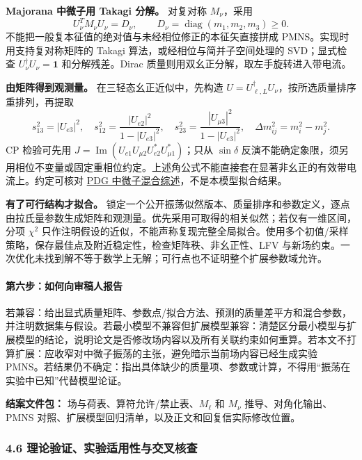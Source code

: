 \documentclass[
  chinese,
  UTF8]{ctexart}
\begin{document}
\textbf{Majorana 中微子用 Takagi 分解。} 对复对称 \(M_\nu\)，采用 \[
U_\nu^T M_\nu U_\nu=D_\nu,\qquad D_\nu=\operatorname{diag}(m_1,m_2,m_3)\ge0.
\] 不能把一般复本征值的绝对值与未经相位修正的本征矢直接拼成
PMNS。实现时用支持复对称矩阵的 Takagi 算法，或经相位与简并子空间处理的
SVD；显式检查 \(U_\nu^\dagger U_\nu=\mathbf1\) 和分解残差。Dirac
质量则用双幺正分解，取左手旋转进入带电流。

\textbf{由矩阵得到观测量。} 在三轻态幺正近似中，先构造
\(U=U_{\ell,L}^\dagger U_\nu\)，按所选质量排序重排列，再提取 \[
s_{13}^2=|U_{e3}|^2,\quad
s_{12}^2=\frac{|U_{e2}|^2}{1-|U_{e3}|^2},\quad
s_{23}^2=\frac{|U_{\mu3}|^2}{1-|U_{e3}|^2},
\quad\Delta m_{ij}^2=m_i^2-m_j^2.
\] CP 检验可先用
\(J=\operatorname{Im}(U_{e1}U_{\mu2}U_{e2}^*U_{\mu1}^*)\)；只从
\(\sin\delta\)
反演不能确定象限，须另用相位不变量或固定重相位约定。上述角公式不能直接套在显著非幺正的有效带电流上。约定可核对
\href{https://pdg.lbl.gov/2025/reviews/rpp2025-rev-neutrino-mixing.pdf}{PDG
中微子混合综述}，不是本模型拟合结果。

\textbf{有了可行结构才拟合。}
锁定一个公开振荡似然版本、质量排序和参数定义，逐点由拉氏量参数生成矩阵和观测量。优先采用可取得的相关似然；若仅有一维区间，分项
\(\chi^2\)
只作注明假设的近似，不能声称复现完整全局拟合。使用多个初值/采样策略，保存最佳点及附近稳定性，检查矩阵秩、非幺正性、LFV
与新场约束。一次优化未找到解不等于数学上无解；可行点也不证明整个扩展参数域允许。

\paragraph{第六步：如何向审稿人报告}\label{ux7b2cux516dux6b65ux5982ux4f55ux5411ux5ba1ux7a3fux4ebaux62a5ux544a}

若兼容：给出显式质量矩阵、参数点/拟合方法、预测的质量差平方和混合参数，并注明数据集与假设。若最小模型不兼容但扩展模型兼容：清楚区分最小模型与扩展模型的结论，说明论文是否修改场内容以及所有关联约束如何重算。若本文不打算扩展：应收窄对中微子振荡的主张，避免暗示当前场内容已经生成实验
PMNS。若结果仍不确定：指出具体缺少的质量项、参数或计算，不得用``振荡在实验中已知''代替模型论证。

\textbf{结案文件包：} 场与荷表、算符允许/禁止表、\(M_\ell\) 和 \(M_\nu\)
推导、对角化输出、PMNS
对照、扩展模型回归清单，以及正文和回复信实际修改位置。

\subsubsection{4.6 理论验证、实验适用性与交叉核查}\label{major-3-step-6}
\end{document}
